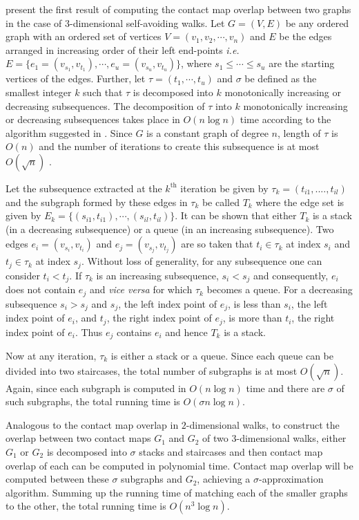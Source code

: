 \citep{agmw07} present the first result of computing the contact map overlap between two graphs in the case of $3$-dimensional self-avoiding walks. Let $G = (V,E)$ be any ordered graph with an ordered set of vertices $V = (v_1,v_2,\cdots,v_n)$ and $E$ be the edges arranged in increasing order of their left end-points \emph{i.e.} $E = \{e_1=(v_{s_1},v_{t_1}),\cdots,e_u=(v_{s_u},v_{t_u})\}$, where $s_1 \leq \cdots \leq s_u$ are the starting vertices of the edges. Further, let $\tau = (t_1,\cdots,t_u)$  and $\sigma$ be defined as the smallest integer $k$ such that $\tau$ is decomposed into $k$ monotonically increasing or decreasing subsequences. The decomposition of $\tau$ into $k$ monotonically increasing or decreasing subsequences takes place in $O(n \log n)$ time according to the algorithm suggested in \citet{k73}. Since $G$ is a constant graph of degree $n$, length of $\tau$ is $O(n)$ and the number of iterations to create this subsequence is at most $O(\sqrt n)$ \citep{erd35}.

Let the subsequence extracted at the $k^{\text{th}}$ iteration be given by $\tau _k = (t_{i1},....,t_{il})$ and the subgraph formed by these edges in $\tau _k$ be called $T_k$ where the edge set is given by $E _k =\{(s_{i1},t_{i1}),\cdots,(s_{il},t_{il})\}$. It can be shown that either $T_k$ is a stack (in a decreasing subsequence) or a queue (in an increasing subsequence). Two edges $e_i=(v_{s_i},v_{t_i})$ and $e_j=(v_{s_j},v_{t_j})$ are so taken that $t_i \in \tau _k$ at index $s_i$ and $t_j \in \tau _k$ at index $s_j$. Without loss of generality, for any subsequence one can consider $t_i < t_j$. If $\tau _k$ is an increasing subsequence, $s_i<s_j$ and consequently, $e_i$ does not contain $e_j$ and \emph{vice versa} for which $\tau _k$ becomes a queue. For a decreasing subsequence $s_i >s_j$ and $s_j$, the left index point of $e_j$, is less than $s_i$, the left index point of $e_i$, and $t_j$, the right index point of $e_j$, is more than $t_i$, the right index point of $e_i$. Thus $e_j$ contains $e_i$ and hence $T_k$ is a stack.

Now at any iteration,  $\tau _k$ is either a stack or a queue. Since each queue can be divided into two staircases, the total number of subgraphs is at most $O(\sqrt n)$. Again, since each subgraph is computed in $O(n \log n)$ time and there are $\sigma$ of such subgraphs, the total running time is $O(\sigma n \log n)$.

Analogous to the contact map overlap in  $2$-dimensional walks, to construct the overlap between two contact maps $G_1$ and $G_2$ of two $3$-dimensional walks, either $G_1$ or $G_2$ is decomposed into $\sigma$ stacks and staircases and then contact map overlap of each can be computed in polynomial time. Contact map overlap will be computed between these $\sigma$ subgraphs and $G_2$, achieving a $\sigma$-approximation algorithm. Summing up the running time of matching each of the smaller graphs to the other, the total running time is $O(n^3 \log n)$. 